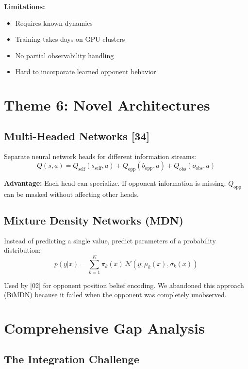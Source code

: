 \documentclass[11pt,a4paper]{report}
\begin{document}
\textbf{Limitations:}
\begin{itemize}
    \item Requires known dynamics
    \item Training takes days on GPU clusters
    \item No partial observability handling
    \item Hard to incorporate learned opponent behavior
\end{itemize}

\section{Theme 6: Novel Architectures}

\subsection{Multi-Headed Networks [34]}

Separate neural network heads for different information streams:
\begin{equation}
    Q(s,a) = Q_{\text{self}}(s_{\text{self}}, a) + Q_{\text{opp}}(b_{\text{opp}}, a) + Q_{\text{obs}}(o_{\text{obs}}, a)
\end{equation}

\textbf{Advantage:} Each head can specialize. If opponent information is missing, $Q_{\text{opp}}$ can be masked without affecting other heads.

\subsection{Mixture Density Networks (MDN)}

Instead of predicting a single value, predict parameters of a probability distribution:
\begin{equation}
    p(y|x) = \sum_{k=1}^{K} \pi_k(x) \, \mathcal{N}(y; \mu_k(x), \sigma_k(x))
\end{equation}

Used by [02] for opponent position belief encoding. We abandoned this approach (BiMDN) because it failed when the opponent was completely unobserved.

\section{Comprehensive Gap Analysis}

\subsection{The Integration Challenge}
\end{document}
